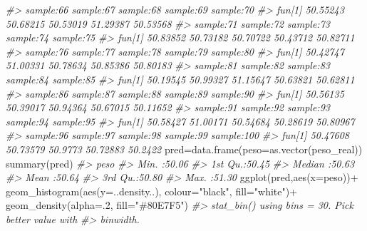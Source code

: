 \documentclass[
]{book}
\newenvironment{Shaded}{\begin{snugshade}}{\end{snugshade}}
\newcommand{\AttributeTok}[1]{\textcolor[rgb]{0.77,0.63,0.00}{#1}}
\newcommand{\CommentTok}[1]{\textcolor[rgb]{0.56,0.35,0.01}{\textit{#1}}}
\newcommand{\DecValTok}[1]{\textcolor[rgb]{0.00,0.00,0.81}{#1}}
\newcommand{\FunctionTok}[1]{\textcolor[rgb]{0.00,0.00,0.00}{#1}}
\newcommand{\NormalTok}[1]{#1}
\newcommand{\OtherTok}[1]{\textcolor[rgb]{0.56,0.35,0.01}{#1}}
\newcommand{\SpecialCharTok}[1]{\textcolor[rgb]{0.00,0.00,0.00}{#1}}
\newcommand{\StringTok}[1]{\textcolor[rgb]{0.31,0.60,0.02}{#1}}
\begin{document}
\begin{Shaded}
\begin{Highlighting}[]
\CommentTok{\#\textgreater{}        sample:66 sample:67 sample:68 sample:69 sample:70}
\CommentTok{\#\textgreater{} fun[1]  50.55243  50.68215  50.53019  51.29387  50.53568}
\CommentTok{\#\textgreater{}        sample:71 sample:72 sample:73 sample:74 sample:75}
\CommentTok{\#\textgreater{} fun[1]  50.83852  50.73182  50.70722  50.43712  50.82711}
\CommentTok{\#\textgreater{}        sample:76 sample:77 sample:78 sample:79 sample:80}
\CommentTok{\#\textgreater{} fun[1]  50.42747  51.00331  50.78634  50.85386  50.80183}
\CommentTok{\#\textgreater{}        sample:81 sample:82 sample:83 sample:84 sample:85}
\CommentTok{\#\textgreater{} fun[1]  50.19545  50.99327  51.15647  50.63821  50.62811}
\CommentTok{\#\textgreater{}        sample:86 sample:87 sample:88 sample:89 sample:90}
\CommentTok{\#\textgreater{} fun[1]  50.56135  50.39017  50.94364  50.67015  50.11652}
\CommentTok{\#\textgreater{}        sample:91 sample:92 sample:93 sample:94 sample:95}
\CommentTok{\#\textgreater{} fun[1]  50.58427  51.00171  50.54684  50.28619  50.80967}
\CommentTok{\#\textgreater{}        sample:96 sample:97 sample:98 sample:99 sample:100}
\CommentTok{\#\textgreater{} fun[1]  50.47608  50.73579   50.9773  50.72883    50.2422}
\NormalTok{pred}\OtherTok{=}\FunctionTok{data.frame}\NormalTok{(}\AttributeTok{peso=}\FunctionTok{as.vector}\NormalTok{(peso\_real))}
\FunctionTok{summary}\NormalTok{(pred)}
\CommentTok{\#\textgreater{}       peso      }
\CommentTok{\#\textgreater{}  Min.   :50.06  }
\CommentTok{\#\textgreater{}  1st Qu.:50.45  }
\CommentTok{\#\textgreater{}  Median :50.63  }
\CommentTok{\#\textgreater{}  Mean   :50.64  }
\CommentTok{\#\textgreater{}  3rd Qu.:50.80  }
\CommentTok{\#\textgreater{}  Max.   :51.30}
\FunctionTok{ggplot}\NormalTok{(pred,}\FunctionTok{aes}\NormalTok{(}\AttributeTok{x=}\NormalTok{peso))}\SpecialCharTok{+}
  \FunctionTok{geom\_histogram}\NormalTok{(}\FunctionTok{aes}\NormalTok{(}\AttributeTok{y=}\NormalTok{..density..), }\AttributeTok{colour=}\StringTok{"black"}\NormalTok{, }\AttributeTok{fill=}\StringTok{"white"}\NormalTok{)}\SpecialCharTok{+}
  \FunctionTok{geom\_density}\NormalTok{(}\AttributeTok{alpha=}\NormalTok{.}\DecValTok{2}\NormalTok{, }\AttributeTok{fill=}\StringTok{"\#80E7F5"}\NormalTok{) }
\CommentTok{\#\textgreater{} \textasciigrave{}stat\_bin()\textasciigrave{} using \textasciigrave{}bins = 30\textasciigrave{}. Pick better value with}
\CommentTok{\#\textgreater{} \textasciigrave{}binwidth\textasciigrave{}.}
\end{Highlighting}
\end{Shaded}
\end{document}
